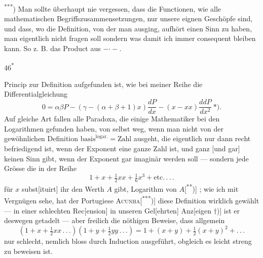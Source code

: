 \noindent\hspace*{\parindent}\textsuperscript{***}) Man sollte überhaupt nie vergessen, dass die Functionen, wie alle mathematischen Begriffszusammensetzungen, nur unsere eignen Geschöpfe sind, und dass, wo die Definition, von der man ausging, aufhört einen Sinn zu haben, man eigentlich nicht fragen soll  sondern was  damit ich immer consequent bleiben kann. So z. B. das Product aus $-\mathord{\cdot}-.$
\par\smallskip\hfill46\textsuperscript{*}\par
\clearpage{}
\noindent Princip zur Definition aufgefunden ist, wie bei meiner Reihe die Differentialgleichung
\[
0=\alpha\beta P-(\gamma-(\alpha+\beta+1)x)\frac{dP}{dx}-(x-xx)\frac{ddP}{dx^2}\ \text{*)}.
\]
\noindent Auf gleiche Art fallen alle Paradoxa, die einige Mathematiker bei den Logarithmen gefunden haben, von selbst weg, wenn man nicht von der gewöhnlichen Definition $\mathrm{basis}^{\mathrm{logar.}}=\text{Zahl}$ ausgeht, die eigentlich nur dann recht befriedigend ist, wenn der Exponent eine ganze Zahl ist, und ganz [und gar] keinen Sinn gibt, wenn der Exponent gar imaginär werden soll — sondern jede Grösse die in der Reihe
\[
1+x+\tfrac{1}{2}xx+\tfrac{1}{6}x^3+\text{etc.}\,{.}\,{.}\,{.}
\]
\noindent für $x$ subst[ituirt] ihr den Werth $A$ gibt, Logarithm von $A$[\textsuperscript{**})] ; wie ich mit Vergnügen sehe, hat der Portugiese \textsc{Acunha}[\textsuperscript{***})] diese Definition wirklich gewählt — in einer schlechten Rec[ension] in unseren Gel[ehrten] Anz[eigen $\dagger$)] ist er deswegen getadelt — aber freilich die nöthigen Beweise, dass allgemein
\[
(1+x+\tfrac{1}{2}xx\,{.}\,{.}\,{.})(1+y+\tfrac{1}{2}yy\,{.}\,{.}\,{.})=1+(x+y)+\tfrac{1}{2}(x+y)^2+{.}\,{.}\,{.}
\]
\noindent nur schlecht, nemlich bloss durch Induction ausgeführt, obgleich es  leicht streng zu beweisen ist.


